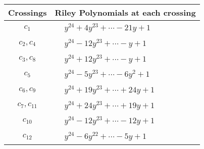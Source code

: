 \documentclass[1p]{elsarticle_modified}
\theoremstyle{definition}
\begin{document}
\begin{tabular}{m{50pt}|m{274pt}}
Crossings & \hspace{64pt}Riley Polynomials at each crossing \\
\hline $$\begin{aligned}c_{1}\end{aligned}$$&$\begin{aligned}
&y^{24}+4 y^{23}+\cdots-21 y+1
\end{aligned}$\\
\hline $$\begin{aligned}c_{2},c_{4}\end{aligned}$$&$\begin{aligned}
&y^{24}-12 y^{23}+\cdots- y+1
\end{aligned}$\\
\hline $$\begin{aligned}c_{3},c_{8}\end{aligned}$$&$\begin{aligned}
&y^{24}+12 y^{23}+\cdots- y+1
\end{aligned}$\\
\hline $$\begin{aligned}c_{5}\end{aligned}$$&$\begin{aligned}
&y^{24}-5 y^{23}+\cdots-6 y^2+1
\end{aligned}$\\
\hline $$\begin{aligned}c_{6},c_{9}\end{aligned}$$&$\begin{aligned}
&y^{24}+19 y^{23}+\cdots+24 y+1
\end{aligned}$\\
\hline $$\begin{aligned}c_{7},c_{11}\end{aligned}$$&$\begin{aligned}
&y^{24}+24 y^{23}+\cdots+19 y+1
\end{aligned}$\\
\hline $$\begin{aligned}c_{10}\end{aligned}$$&$\begin{aligned}
&y^{24}-12 y^{23}+\cdots-12 y+1
\end{aligned}$\\
\hline $$\begin{aligned}c_{12}\end{aligned}$$&$\begin{aligned}
&y^{24}-6 y^{22}+\cdots-5 y+1
\end{aligned}$\\
\hline
\end{tabular}\\~\\
\end{document}
